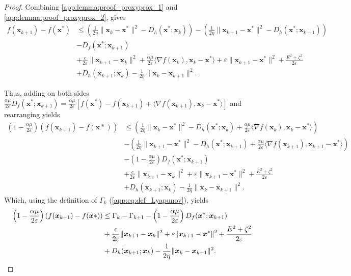 \documentclass[10pt,a4paper]{amsart}
\def\eps{{\varepsilon}}
\def\vx{{\bm{x}}}
\begin{document}
\begin{proof}
    Combining \cref{app:lemma:proof_proxyprox_1} and \cref{app:lemma:proof_proxyprox_2}, gives 
    \begin{align*}
        f(\vx_{k+1}) - f(\vx^*) &\le  \left(\frac{1}{2\eta}\|\vx_{k}- \vx^*\|^2 - D_{h}(\vx^*;\vx_{k})\right) - \left(\frac{1}{2\eta}\|\vx_{k+1}- \vx^*\|^2 - D_{h}(\vx^*;\vx_{k+1}) \right) \\
        &- D_f(\vx^*;\vx_{k+1})\\
        &+ \frac{c}{2\eps}\|\vx_{k+1} - \vx_k\|^2  + \frac{\alpha \mu }{2\eps} \langle\nabla f(\vx_k), \vx_k - \vx^* \rangle+ \eps\|\vx_{k+1}-\vx^*\|^2 + \frac{E^2 + \zeta^2}{2\eps}\\
        &+ D_h(\vx_{k+1};\vx_k) - \frac{1}{2\eta}\|\vx_{k}- \vx_{k+1}\|^2.
    \end{align*}
    
    Thus, adding on both sides $\frac{\alpha \mu}{2\eps}D_f(\vx^*;\vx_{k+1}) = \frac{\alpha \mu}{2\eps}[f(\vx^*) - f(\vx_{k+1}) + \langle \nabla f(\vx_{k+1}), \vx_k - \vx^* \rangle]$ and rearranging yields
    \begin{align*}
         \left(1 - \frac{\alpha \mu}{2 \eps}\right)\left(f(\vx_{k+1}) - f(\vx*)\right) &\le
         \left(\frac{1}{2\eta}\|\vx_{k}- \vx^*\|^2 - D_{h}(\vx^*;\vx_{k}) + \frac{\alpha \mu}{2 \eps} \langle \nabla f(\vx_k),\vx_k - \vx^*\rangle\right) \\
         &- \left(\frac{1}{2\eta}\|\vx_{k+1}- \vx^*\|^2 - D_{h}(\vx^*;\vx_{k+1}) + \frac{\alpha \mu}{2 \eps} \langle \nabla f(\vx_{k+1}),\vx_{k+1} - \vx^*\rangle \right)\\
         &- \left(1 - \frac{\alpha \mu}{2 \eps}\right) D_f(\vx^*;\vx_{k+1})\\
        & + \frac{c}{2\eps}\|\vx_{k+1} - \vx_k\|^2 + \eps\|\vx_{k+1}-\vx^*\|^2 +  \frac{E^2 + \zeta^2}{2\eps} \\
        & + D_{h}(\vx_{k+1};\vx_k ) - \frac{1}{2\eta}\|\vx_{k} - \vx_{k+1}\|^2 . 
    \end{align*}
    Which, using the definition of $\Gamma_k$ (\cref{app:eq:def_Lyapunov}), yields
    \begin{align}
         \left(1 - \frac{\alpha \mu}{2 \eps}\right)\left(f(\vx_{k+1}) - f(\vx*)\right) &\le \Gamma_k - \Gamma_{k+1} - \left(1 - \frac{\alpha \mu}{2 \eps}\right) D_f(\vx^*;\vx_{k+1}) \notag\\
    & + \frac{c}{2\eps}\|\vx_{k+1} - \vx_k\|^2 + \eps\|\vx_{k+1}-\vx^*\|^2 +  \frac{E^2 + \zeta^2}{2\eps} \notag\\
    & + D_{h}(\vx_{k+1};\vx_k ) - \frac{1}{2\eta}\|\vx_{k} - \vx_{k+1}\|^2. \label{app:eq:decomposition_withlyap_1}
    \end{align}
    

\end{proof}
\end{document}
